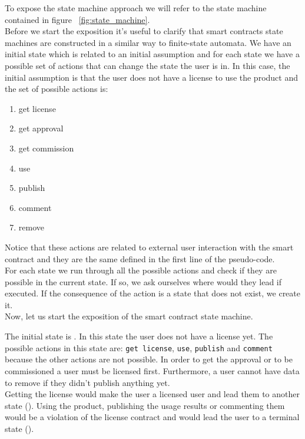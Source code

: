 \documentclass{scrbook}
\newcommand*\circled[1]{\tikz[baseline=(char.base)]{
            \node[shape=circle,draw,inner sep=2pt] (char) {#1};}}
\begin{document}
To expose the state machine approach we will refer to the state machine contained in figure ~\ref{fig:state_machine}. \\

Before we start the exposition it's useful to clarify that smart contracts state machines are constructed in a similar way to finite-state automata. We have an initial state which is related to an initial assumption and for each state we have a possible set of actions that can change the state the user is in. In this case, the initial assumption is that the user does not have a license to use the product and the set of possible actions is:

\begin{enumerate}
    \item get license
    \item get approval
    \item get commission
    \item use
    \item publish
    \item comment
    \item remove
\end{enumerate}

Notice that these actions are related to external user interaction with the smart contract and they are the same defined in the first line of the pseudo-code. \\

For each state we run through all the possible actions and check if they are possible in the current state. If so, we ask ourselves where would they lead if executed. If the consequence of the action is a state that does not exist, we create it. \\

Now, let us start the exposition of the smart contract state machine.

The initial state is \circled{1}. In this state the user does not have a license yet. The possible actions in this state are: \texttt{get license}, \texttt{use}, \texttt{publish} and \texttt{comment} because the other actions are not possible. In order to get the approval or to be commissioned a user must be licensed first. Furthermore, a user cannot have data to remove if they didn't publish anything yet. \\

Getting the license would make the user a licensed user and lead them to another state (\circled{2}). Using the product, publishing the usage results or commenting them would be a violation of the license contract and would lead the user to a terminal state (\circled{6}).\\
\end{document}
